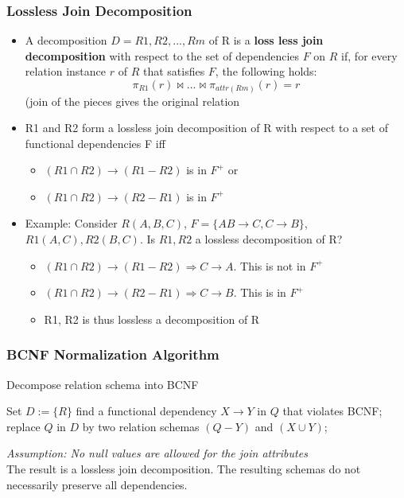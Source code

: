 \subsubsection{Lossless Join Decomposition}
\begin{itemize}
    \item A decomposition $D=R1,R2,...,Rm$ of R is a \textbf{loss less join decomposition} with respect to the set of dependencies $F$ on $R$ if, for every relation instance $r$ of $R$ that satisfies $F$, the following holds: \[
    \pi_{R1}(r) \bowtie ... \bowtie \pi_{attr(Rm)}(r)=r
    \] (join of the pieces gives the original relation
    \item R1 and R2 form a lossless join decomposition of R with respect to a set of functional dependencies F iff 
    \begin{itemize}
        \item $(R1 \cap R2) \rightarrow (R1-R2)$ is in $F^+$ or
        \item $(R1 \cap R2) \rightarrow (R2-R1)$ is in $F^+$
    \end{itemize}
    \item Example: Consider $R(A,B,C)$, $F=\{AB\rightarrow C, C \rightarrow B\}$, $R1(A,C), R2(B,C)$. Is $R1, R2$ a lossless decomposition of R?
    \begin{itemize}
        \item $(R1 \cap R2) \rightarrow (R1-R2) \Rightarrow C \rightarrow A$. This is not in $F^+$
        \item $(R1 \cap R2) \rightarrow (R2-R1) \Rightarrow C \rightarrow B$. This is in $F^+$ 
        \item R1, R2 is thus lossless a decomposition of R
    \end{itemize}
\end{itemize}

\subsubsection{BCNF Normalization Algorithm}
\begin{algorithm}
\caption{Decompose relation schema into BCNF}
\begin{algorithmic}[1] %
\State Set $D := \{R\}$
    \State find a functional dependency $X \rightarrow Y$ in $Q$ that violates BCNF;
    \State replace $Q$ in $D$ by two relation schemas $(Q - Y)$ and $(X \cup Y)$;
\EndWhile
\end{algorithmic}
\end{algorithm}
\quad \textit{Assumption: No null values are allowed for the join attributes}\\
The result is a lossless join decomposition. The resulting schemas do not necessarily preserve all dependencies.

